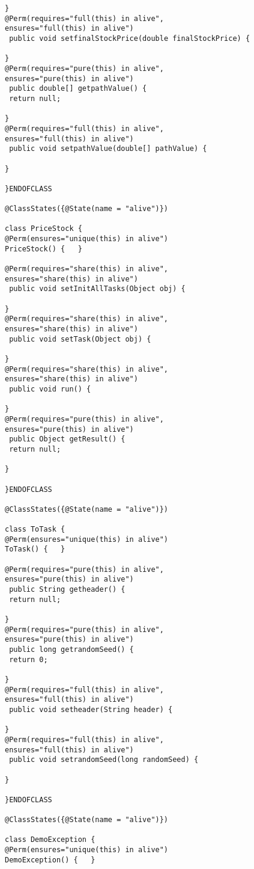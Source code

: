 \documentclass[10pt]{article}
\begin{document}
\begin{lstlisting}
} 
@Perm(requires="full(this) in alive",
ensures="full(this) in alive")
 public void setfinalStockPrice(double finalStockPrice) {
 
} 
@Perm(requires="pure(this) in alive",
ensures="pure(this) in alive")
 public double[] getpathValue() {
 return null;
 
} 
@Perm(requires="full(this) in alive",
ensures="full(this) in alive")
 public void setpathValue(double[] pathValue) {
 
} 

}ENDOFCLASS

@ClassStates({@State(name = "alive")})

class PriceStock {
@Perm(ensures="unique(this) in alive")
PriceStock() {   }

@Perm(requires="share(this) in alive",
ensures="share(this) in alive")
 public void setInitAllTasks(Object obj) {
 
} 
@Perm(requires="share(this) in alive",
ensures="share(this) in alive")
 public void setTask(Object obj) {
 
} 
@Perm(requires="share(this) in alive",
ensures="share(this) in alive")
 public void run() {
 
} 
@Perm(requires="pure(this) in alive",
ensures="pure(this) in alive")
 public Object getResult() {
 return null;
 
} 

}ENDOFCLASS

@ClassStates({@State(name = "alive")})

class ToTask {
@Perm(ensures="unique(this) in alive")
ToTask() {   }

@Perm(requires="pure(this) in alive",
ensures="pure(this) in alive")
 public String getheader() {
 return null;
 
} 
@Perm(requires="pure(this) in alive",
ensures="pure(this) in alive")
 public long getrandomSeed() {
 return 0;
 
} 
@Perm(requires="full(this) in alive",
ensures="full(this) in alive")
 public void setheader(String header) {
 
} 
@Perm(requires="full(this) in alive",
ensures="full(this) in alive")
 public void setrandomSeed(long randomSeed) {
 
} 

}ENDOFCLASS

@ClassStates({@State(name = "alive")})

class DemoException {
@Perm(ensures="unique(this) in alive")
DemoException() {   }



\end{lstlisting}
\end{document}
